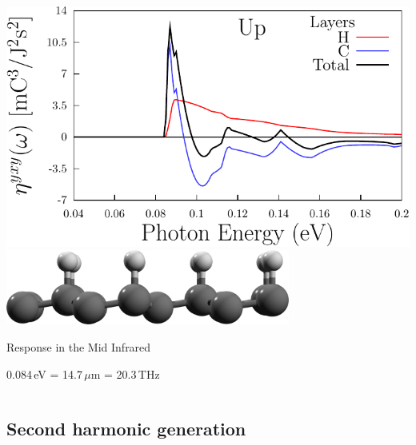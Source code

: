 \documentclass{beamer}
\begin{document}
\begin{frame}
\begin{columns}
\begin{center}
\vspace{-1mm}
\includegraphics[width=1.0\textwidth]{figs/plots/eta-up_y.pdf}
\vspace{6mm}
\includegraphics[width=0.7\textwidth]{figs/up2.png}

\vspace{7mm}
Response in the Mid Infrared

0.084\,eV = 14.7\,$\mu$m = 20.3\,THz

\end{center}


\end{columns}

\end{frame}



\subsection{Second harmonic generation}
\end{document}
